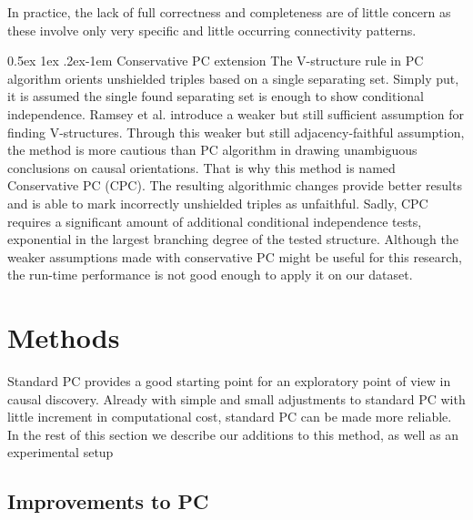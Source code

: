 \documentclass[a4paper, 10pt, english, onecolumn]{article}
\makeatletter
\renewcommand{\paragraph}{%
  \@startsection{paragraph}{4}%
  {\z@}{0.5ex \@plus 1ex \@minus .2ex}{-1em}%
  {\normalfont\normalsize\bfseries}%
}
\makeatother
\begin{document}
In practice, the lack of full correctness and completeness are of little concern as these involve only very specific and little occurring connectivity patterns\cite[p.127-130]{spirtes2000}.

\paragraph{Conservative PC extension}
The V-structure rule in PC algorithm orients unshielded triples based on a single separating set. 
Simply put, it is assumed the single found separating set is enough to show conditional independence. 
Ramsey et al. \cite{ramsey2012} introduce a weaker but still sufficient assumption for finding V-structures.
Through this weaker but still adjacency-faithful assumption, the method is more cautious than PC algorithm in drawing unambiguous conclusions on causal orientations.
That is why this method is named Conservative PC (CPC).
The resulting algorithmic changes provide better results and is able to mark incorrectly unshielded triples as unfaithful.
Sadly, CPC requires a significant amount of additional conditional independence tests, exponential in the largest branching degree of the tested structure.
Although the weaker assumptions made with conservative PC might be useful for this research, the run-time performance is not good enough to apply it on our dataset.

\section{Methods}\label{sec:methods}%
Standard PC provides a good starting point for an exploratory point of view in causal discovery.
Already with simple and small adjustments to standard PC with little increment in computational cost, standard PC can be made more reliable.
In the rest of this section we describe our additions to this method, as well as an experimental setup

\subsection{Improvements to PC}
\end{document}
